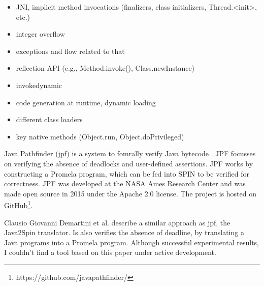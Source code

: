 \begin{itemize}
    \item JNI, implicit method invocations (finalizers, class initializers, Thread.<init>, etc.)
    \item integer overflow
    \item exceptions and flow related to that
    \item reflection API (e.g., Method.invoke(), Class.newInstance)
    \item invokedynamic
    \item code generation at runtime, dynamic loading
    \item different class loaders
    \item key native methods (Object.run, Object.doPrivileged)
\end{itemize}

Java Pathfinder (jpf) is a system to fomrally verify Java bytecode \cite{havelund2000model}.
JPF focusses on verifying the absence of deadlocks and user-defined assertions.
JPF works by constructing a Promela program, which can be fed into SPIN to be
verified for correctness. JPF was developed at the NASA Ames Research Center and
was made open source in 2015 under the Apache 2.0 license. The project is hosted
on GitHub\footnote{https://github.com/javapathfinder/}.

Clausio Giovanni Demartini et al. \cite{Demartini1998ModelingAV} describe a 
similar approach as jpf, the Java2Spin translator. Is also verifies the absence 
of deadline, by translating a Java programs into a Promela program. Although 
successful experimental results, I couldn't find a tool based on this paper under 
active development. 

